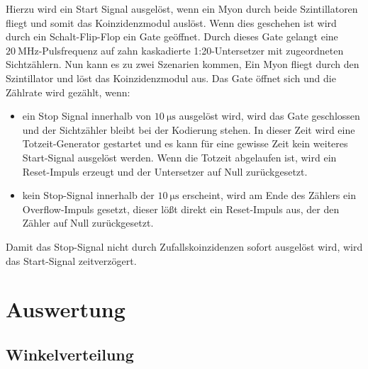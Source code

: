\documentclass{article}
\begin{document}
Hierzu wird ein Start Signal ausgelöst, wenn ein Myon durch beide Szintillatoren fliegt und somit das Koinzidenzmodul auslöst. 
Wenn dies geschehen ist wird durch ein Schalt-Flip-Flop ein Gate geöffnet. Durch dieses Gate gelangt eine $\SI{20}{\mega\hertz}$-Pulsfrequenz auf zahn kaskadierte 1:20-Untersetzer mit
zugeordneten Sichtzählern. Nun kann es zu zwei Szenarien kommen, Ein Myon fliegt durch den Szintillator und löst das Koinzidenzmodul aus. Das Gate öffnet sich und die Zählrate wird gezählt, wenn:
\begin{itemize}
    \item ein Stop Signal innerhalb von $\SI{10}{\micro\second}$ ausgelöst wird, wird das Gate geschlossen und der Sichtzähler bleibt bei der Kodierung stehen. In dieser Zeit wird eine Totzeit-Generator gestartet
    und es kann für eine gewisse Zeit kein weiteres Start-Signal ausgelöst werden. Wenn die Totzeit abgelaufen ist, wird ein Reset-Impuls erzeugt und der Untersetzer auf Null zurückgesetzt.
    \item kein Stop-Signal innerhalb der $\SI{10}{\micro\second}$ erscheint, wird am Ende des Zählers ein Overflow-Impuls gesetzt, dieser lößt direkt ein Reset-Impuls aus, der den Zähler auf Null zurückgesetzt. 
\end{itemize}
Damit das Stop-Signal nicht durch Zufallskoinzidenzen sofort ausgelöst wird, wird das Start-Signal zeitverzögert.

\section{Auswertung}

\subsection{Winkelverteilung}
\end{document}
